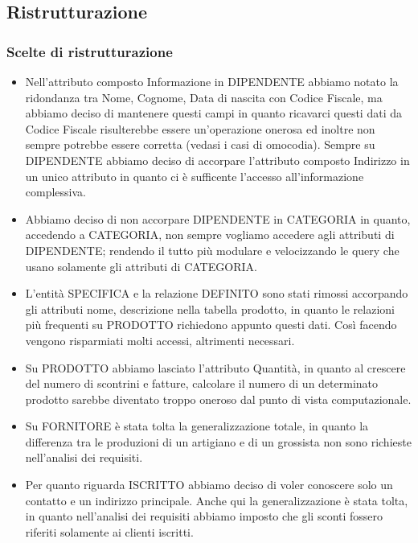 \subsection{Ristrutturazione}

\subsubsection{Scelte di ristrutturazione}
\begin{itemize}

\item Nell'attributo composto Informazione in DIPENDENTE abbiamo notato la ridondanza tra Nome, Cognome, Data di nascita con Codice Fiscale, ma abbiamo deciso di mantenere questi campi in quanto ricavarci questi dati da Codice Fiscale risulterebbe essere un'operazione onerosa ed inoltre non sempre potrebbe essere corretta (vedasi i casi di omocodia). Sempre su DIPENDENTE abbiamo deciso di accorpare l'attributo composto Indirizzo in un unico attributo in quanto ci \`e sufficente l'accesso all'informazione complessiva.

\item Abbiamo deciso di non accorpare DIPENDENTE in CATEGORIA in quanto, accedendo a CATEGORIA, non sempre vogliamo accedere agli attributi di DIPENDENTE; rendendo il tutto pi\`u modulare e velocizzando le query che usano solamente gli attributi di CATEGORIA.

\item L'entit\`a SPECIFICA e la relazione DEFINITO sono stati rimossi accorpando gli attributi nome, descrizione nella tabella prodotto, in quanto le relazioni pi\`u frequenti su PRODOTTO richiedono appunto questi dati. Cos\`i facendo vengono risparmiati molti accessi, altrimenti necessari.

\item Su PRODOTTO abbiamo lasciato l'attributo Quantit\`a, in quanto al crescere del numero di scontrini e fatture, calcolare il numero di un determinato prodotto sarebbe diventato troppo oneroso dal punto di vista computazionale.

\item Su FORNITORE \`e stata tolta la generalizzazione totale, in quanto la differenza tra le produzioni di un artigiano e di un grossista non sono richieste nell'analisi dei requisiti.

\item Per quanto riguarda ISCRITTO abbiamo deciso di voler conoscere solo un contatto e un indirizzo principale. Anche qui la generalizzazione \`e stata tolta, in quanto nell'analisi dei requisiti abbiamo imposto che gli sconti fossero riferiti solamente ai clienti iscritti.
  
\end{itemize}

